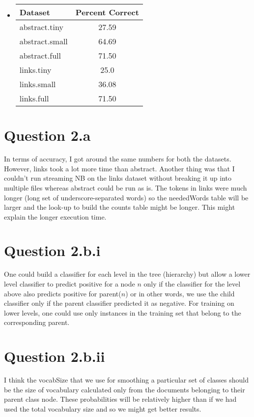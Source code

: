 \documentclass[paper=a4, fontsize=11pt]{scrartcl} %
\numberwithin{equation}{section} %
\numberwithin{figure}{section} %
\numberwithin{table}{section} %
\begin{document}
\begin{itemize}
\begin{verbatim}
\end{verbatim}
\item
\begin{tabular}{|l | c|}
\hline
\textbf{Dataset} & \textbf{Percent Correct} \\
\hline
abstract.tiny & 27.59 \\
abstract.small & 64.69 \\
abstract.full & 71.50 \\ %
links.tiny & 25.0 \\
links.small & 36.08 \\
links.full & 71.50 \\ %
\hline
\end{tabular}
\end{itemize}

\section*{\textbf{Question 2.a}}
In terms of accuracy, I got around the same numbers for both the datasets. However, links took a lot more time than abstract. Another thing was that I couldn't run streaming NB on the links dataset without breaking it up into multiple files whereas abstract could be run as is. The tokens in links were much longer (long set of underscore-separated words) so the neededWords table will be larger and the look-up to build the counts table might be longer. This might explain the longer execution time.

\section*{\textbf{Question 2.b.i}}
One could build a classifier for each level in the tree (hierarchy) but allow a lower level classifier to predict positive for a node $n$ only if the classifier for the level above also predicts positive for parent($n$) or in other words, we use the child classifier only if the parent classifier predicted it as negative. For training on lower levels, one could use only instances in the training set that belong to the corresponding parent.   

\section*{\textbf{Question 2.b.ii}}
I think the vocabSize that we use for smoothing a particular set of classes should be the size of vocabulary calculated only from the documents belonging to their parent class node. These probabilities will be relatively higher than if we had used the total vocabulary size and so we might get better results. 
\end{document}
